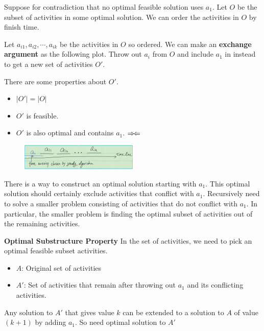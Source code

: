 \begin{claimproof}
	Suppose for contradiction that no optimal feasible solution uses $a_1$. 
Let $O$ be the subset of activities in some optimal solution. We can order the 
activities in $O$ by finish time.

    Let $a_{i1}, a_{i2}, \cdots, a_{ik}$ be the activities in $O$ so ordered. 
We can make an \textbf{exchange argument} as the following plot. Throw out 
$a_i$ from $O$ and include $a_1$ in instead to get a new set of activities 
$O'$. 

    There are some properties about $O'$.
    \begin{itemize}
        \item $|O'| = |O|$
        \item $O'$ is feasible.
        \item $O'$ is also optimal and contains $a_1$. 
$\Rightarrow\mskip-\thinmuskip\Leftarrow$
    \end{itemize}

    \begin{figure}[H]
    \centering
    \includegraphics[width=0.5\textwidth]{exchange-selection-1.png}
    \end{figure}
\end{claimproof}

There is a way to construct an optimal solution starting with $a_1$. This 
optimal solution should certainly exclude activities that conflict with $a_1$. 
Recursively need to solve a smaller problem consisting of activities that do 
not conflict with $a_1$. In particular, the smaller problem is finding the 
optimal subset of activities out of the remaining activities.

\begin{claim}
    \textbf{Optimal Substructure Property}
	In the set of activities, we need to pick an optimal feasible 
subset activities.
\end{claim}
\begin{claimproof}{}
\begin{itemize}
	\item $A$: Original set of activities
	\item $A'$: Set of activities that remain after throwing out $a_1$ and 
its conflicting activities.
\end{itemize}
    Any solution to $A'$ that gives value $k$ can be extended to a solution to 
$A$ of value $(k+1)$ by adding $a_1$. So need optimal solution to $A'$
\end{claimproof}

